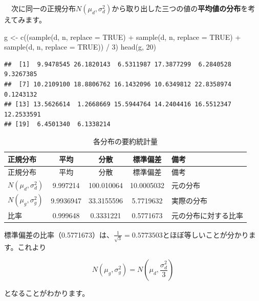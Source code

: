 \documentclass[]{tufte-handout}
\newenvironment{Shaded}{}{}
\newcommand{\AttributeTok}[1]{\textcolor[rgb]{0.49,0.56,0.16}{#1}}
\newcommand{\ConstantTok}[1]{\textcolor[rgb]{0.53,0.00,0.00}{#1}}
\newcommand{\DecValTok}[1]{\textcolor[rgb]{0.25,0.63,0.44}{#1}}
\newcommand{\FunctionTok}[1]{\textcolor[rgb]{0.02,0.16,0.49}{#1}}
\newcommand{\NormalTok}[1]{#1}
\newcommand{\OtherTok}[1]{\textcolor[rgb]{0.00,0.44,0.13}{#1}}
\newcommand{\SpecialCharTok}[1]{\textcolor[rgb]{0.25,0.44,0.63}{#1}}
\begin{document}
　次に同一の正規分布\(N(\mu_d, \sigma^2_d)\)から取り出した三つの値の\textbf{平均値の分布}を考えてみます。
　

\begin{Shaded}
\begin{Highlighting}[numbers=left,,]
\NormalTok{g }\OtherTok{\textless{}{-}} \FunctionTok{c}\NormalTok{((}\FunctionTok{sample}\NormalTok{(d, n, }\AttributeTok{replace =} \ConstantTok{TRUE}\NormalTok{) }\SpecialCharTok{+} \FunctionTok{sample}\NormalTok{(d, n, }\AttributeTok{replace =} \ConstantTok{TRUE}\NormalTok{) }
        \SpecialCharTok{+} \FunctionTok{sample}\NormalTok{(d, n, }\AttributeTok{replace =} \ConstantTok{TRUE}\NormalTok{)) }\SpecialCharTok{/} \DecValTok{3}\NormalTok{)}
\FunctionTok{head}\NormalTok{(g, }\DecValTok{20}\NormalTok{)}
\end{Highlighting}
\end{Shaded}

\begin{verbatim}
##  [1]  9.9478545 26.1820143  6.5311987 17.3877299  6.2840528  9.3267385
##  [7] 10.2109100 18.8806762 16.1432096 10.6349812 22.8358974  0.1243132
## [13] 13.5626614  1.2668669 15.5944764 14.2404416 16.5512347 12.2533591
## [19]  6.4501340  6.1338214
\end{verbatim}

\begin{longtable}[]{@{}lcccl@{}}
\caption{各分布の要約統計量}\tabularnewline
\toprule
正規分布 & 平均 & 分散 & 標準偏差 & 備考 \\
\midrule
\endfirsthead
\toprule
正規分布 & 平均 & 分散 & 標準偏差 & 備考 \\
\midrule
\endhead
\(N(\mu_d, \sigma^2_d)\) & 9.997214 & 100.010064 & 10.0005032 &
元の分布 \\
\(N(\mu_g, \sigma^2_g)\) & 9.9936947 & 33.3155596 & 5.7719632 &
実際の分布 \\
比率 & 0.999648 & 0.3331221 & 0.5771673 & 元の分布に対する比率 \\
\bottomrule
\end{longtable}

標準偏差の比率（0.5771673）は、\(\frac{1}{\sqrt{3}} = 0.5773503\)とほぼ等しいことが分かります。これより

\[N(\mu_g, \sigma^2_g) = N(\mu_d, \frac{\sigma^2_d}{3})\]

となることがわかります。
\end{document}
